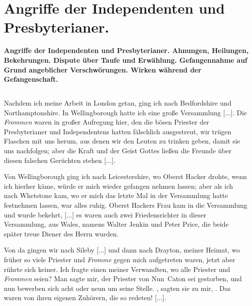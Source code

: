 


\chapter[Angriffe der Independenten und Presbyterianer.]{Angriffe der Independenten und Presbyterianer.}

\begin{center}
\textbf{Angriffe der Independenten und Presbyterianer. Ahnungen,
Heilungen, Bekehrungen. Dispute über Taufe und Erwählung.
Gefangennahme auf Grund angeblicher Verschwörungen. Wirken
während der Gefangenschaft.}
\end{center}

\section{}

Nachdem ich meine Arbeit in London getan, ging ich nach
Bedfordshire und
Northamptonshire. In 
Wellingborough hatte
ich eine große Versammlung [...]. Die \textit{Frommen} waren in
großer Aufregung hier, den die bösen Priester der 
Presbyterianer und 
Independentens hatten fälschlich ausgestreut, 
wir trügen
Flaschen mit uns herum, aus denen wir den Leuten zu trinken
geben, damit sie uns nachfolgen; aber die Kraft und der Geist
Gottes ließen die Freunde über diesen falschen Gerüchten stehen [...].


Von Wellingborough ging ich nach Leicestershire, 
wo Oberst Hacker drohte, wenn ich hierher 
käme, würde er mich wieder gefangen nehmen lassen; aber als 
ich nach Whetstone kam, wo er
mich das letzte Mal in der Versammlung hatte festnehmen lassen,
war alles ruhig. Oberst Hackers Frau kam in die Versammlung 
und wurde bekehrt, [...] es waren auch zwei Friedensrichter 
in dieser Versammlung, aus Wales, namens Walter
Jenkin und Peter Price, 
die beide später treue Diener des Herrn wurden.

Von da gingen wir nach Sileby [...] und dann nach 
Drayton, meiner Heimat, wo früher so viele 
Priester und \textit{Fromme} gegen
mich aufgetreten waren, jetzt aber rührte sich keiner. Ich fragte
einen meiner Verwandten, wo alle Priester 
und \textit{Frommen} seien? Man sagte mir, der Priester von 
Nun~Caton sei gestorben, und nun bewerben 
sich acht oder neun um seine Stelle.
, sagten sie zu mir,
. Das waren von ihren
eigenen Zuhörern, die so redeten! [...].


